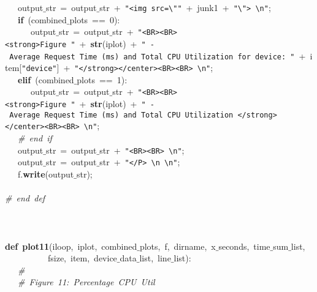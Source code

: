 \mbox{}\ \ \ output$\_$str\ =\ output$\_$str\ +\ \texttt{"{}\textless{}img\ src=\textbackslash{}"{}"{}}\ +\ junk1\ +\ \texttt{"{}\textbackslash{}"{}\textgreater{}\ \textbackslash{}n"{}}; \\
\mbox{}\ \ \ \textbf{if}\ (combined$\_$plots\ ==\ 0): \\
\mbox{}\ \ \ \ \ \ output$\_$str\ =\ output$\_$str\ +\ \texttt{"{}\textless{}BR\textgreater{}\textless{}BR\textgreater{}\textless{}strong\textgreater{}Figure\ "{}}\ +\ \textbf{str}(iplot)\ +\ \texttt{"{}\ -\ Average\ Request\ Time\ (ms)\ and\ Total\ CPU\ Utilization\ for\ device:\ "{}}\ +\ item[\texttt{"{}device"{}}]\ +\ \texttt{"{}\textless{}/strong\textgreater{}\textless{}/center\textgreater{}\textless{}BR\textgreater{}\textless{}BR\textgreater{}\ \textbackslash{}n"{}}; \\
\mbox{}\ \ \ \textbf{elif}\ (combined$\_$plots\ ==\ 1): \\
\mbox{}\ \ \ \ \ \ output$\_$str\ =\ output$\_$str\ +\ \texttt{"{}\textless{}BR\textgreater{}\textless{}BR\textgreater{}\textless{}strong\textgreater{}Figure\ "{}}\ +\ \textbf{str}(iplot)\ +\ \texttt{"{}\ -\ Average\ Request\ Time\ (ms)\ and\ Total\ CPU\ Utilization\ \textless{}/strong\textgreater{}\textless{}/center\textgreater{}\textless{}BR\textgreater{}\textless{}BR\textgreater{}\ \textbackslash{}n"{}}; \\
\mbox{}\ \ \ \textit{\#\ end\ if} \\
\mbox{}\ \ \ output$\_$str\ =\ output$\_$str\ +\ \texttt{"{}\textless{}BR\textgreater{}\textless{}BR\textgreater{}\ \textbackslash{}n"{}}; \\
\mbox{}\ \ \ output$\_$str\ =\ output$\_$str\ +\ \texttt{"{}\textless{}/P\textgreater{}\ \textbackslash{}n\ \textbackslash{}n"{}}; \\
\mbox{}\ \ \ f.\textbf{write}(output$\_$str); \\
\mbox{}\ \ \  \\
\mbox{}\textit{\#\ end\ def} \\
\mbox{} \\
\mbox{} \\
\mbox{} \\
\mbox{}\textbf{def}\ \textbf{plot11}(iloop,\ iplot,\ combined$\_$plots,\ f,\ dirname,\ x$\_$seconds,\ time$\_$sum$\_$list, \\
\mbox{}\ \ \ \ \ \ \ \ \ \ fsize,\ item,\ device$\_$data$\_$list,\ line$\_$list): \\
\mbox{}\ \ \ \textit{\#} \\
\mbox{}\ \ \ \textit{\#\ Figure\ 11:\ Percentage\ CPU\ Util} \\
